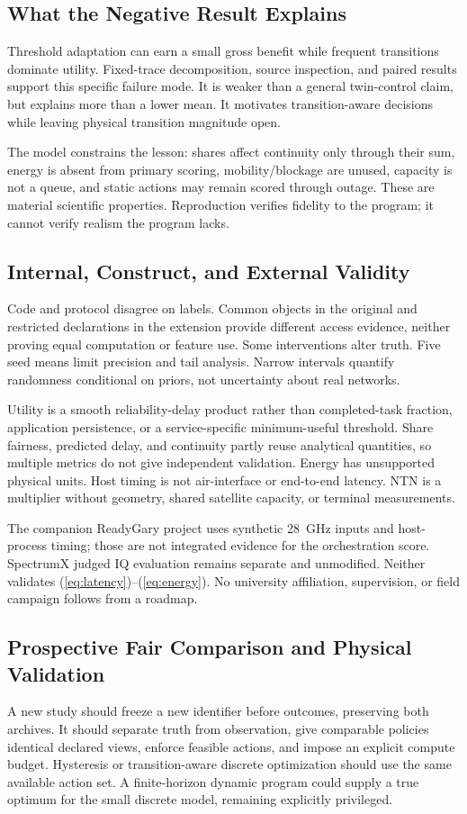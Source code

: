 \documentclass[letterpaper,journal]{IEEEtran}
\begin{document}
\subsection{What the Negative Result Explains}
Threshold adaptation can earn a small gross benefit while frequent transitions dominate utility. Fixed-trace decomposition, source inspection, and paired results support this specific failure mode. It is weaker than a general twin-control claim, but explains more than a lower mean. It motivates transition-aware decisions while leaving physical transition magnitude open.

The model constrains the lesson: shares affect continuity only through their sum, energy is absent from primary scoring, mobility/blockage are unused, capacity is not a queue, and static actions may remain scored through outage. These are material scientific properties. Reproduction verifies fidelity to the program; it cannot verify realism the program lacks.

\subsection{Internal, Construct, and External Validity}
Code and protocol disagree on labels. Common objects in the original and restricted declarations in the extension provide different access evidence, neither proving equal computation or feature use. Some interventions alter truth. Five seed means limit precision and tail analysis. Narrow intervals quantify randomness conditional on priors, not uncertainty about real networks.

Utility is a smooth reliability-delay product rather than completed-task fraction, application persistence, or a service-specific minimum-useful threshold. Share fairness, predicted delay, and continuity partly reuse analytical quantities, so multiple metrics do not give independent validation. Energy has unsupported physical units. Host timing is not air-interface or end-to-end latency. NTN is a multiplier without geometry, shared satellite capacity, or terminal measurements.

The companion ReadyGary project uses synthetic 28~GHz inputs and host-process timing; those are not integrated evidence for the orchestration score. SpectrumX judged IQ evaluation remains separate and unmodified. Neither validates (\ref{eq:latency})--(\ref{eq:energy}). No university affiliation, supervision, or field campaign follows from a roadmap.

\subsection{Prospective Fair Comparison and Physical Validation}
A new study should freeze a new identifier before outcomes, preserving both archives. It should separate truth from observation, give comparable policies identical declared views, enforce feasible actions, and impose an explicit compute budget. Hysteresis or transition-aware discrete optimization should use the same available action set. A finite-horizon dynamic program could supply a true optimum for the small discrete model, remaining explicitly privileged.
\end{document}
